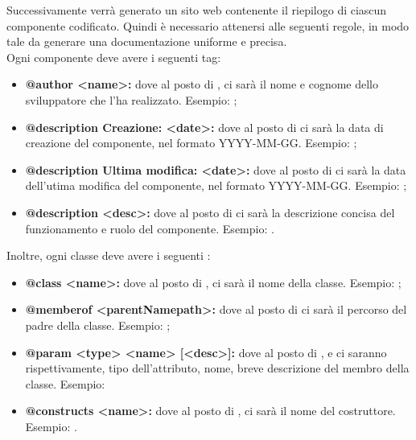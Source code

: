            		Successivamente verrà generato un sito web contenente il riepilogo di ciascun componente codificato. Quindi è necessario attenersi alle seguenti regole, in modo tale da generare una documentazione uniforme e precisa. \\
           		Ogni componente deve avere i seguenti tag:
           		\begin{itemize}
           			\item \textbf{@author <name>:} dove al posto di , ci sarà il nome e cognome dello sviluppatore che l'ha realizzato. Esempio: ;
           			\item \textbf{@description Creazione: <date>:} dove al posto di  ci sarà la data di creazione del componente, nel formato YYYY-MM-GG. Esempio: ;
           			\item \textbf{@description Ultima modifica: <date>:} dove al posto di  ci sarà la data dell'utima modifica del componente, nel formato YYYY-MM-GG. Esempio: ;
           			\item \textbf{@description <desc>:} dove al posto di  ci sarà la descrizione concisa del funzionamento e ruolo del componente. Esempio: .
           		\end{itemize} 
           		Inoltre, ogni classe deve avere i seguenti :
           		\begin{itemize}
           			\item \textbf{@class <name>:} dove al posto di , ci sarà il nome della classe. Esempio: ;
           			\item \textbf{@memberof <parentNamepath>:} dove al posto di  ci sarà il percorso del padre della classe. Esempio: ;
           			\item \textbf{@param <{type}> <name> [<desc>]:} dove al posto di ,  e  ci saranno rispettivamente, tipo dell'attributo, nome, breve descrizione del membro della classe. Esempio: 
           			\item \textbf{@constructs <name>:} dove al posto di , ci sarà il nome del costruttore. Esempio: .
           		\end{itemize}
